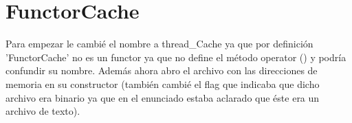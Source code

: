 \documentclass[a4paper,12pt]{report}
\begin{document}
 \section{FunctorCache}

Para empezar le cambi\'e el nombre a thread\_Cache ya que por definici\'on 'FunctorCache' no es un functor ya que no define el m\'etodo operator () y podr\'ia confundir su nombre. Adem\'as ahora abro el archivo con las direcciones de memoria en su constructor (tambi\'en cambi\'e el flag que indicaba que dicho archivo era binario ya que en el enunciado estaba aclarado que \'este era un archivo de texto).
\end{document}
